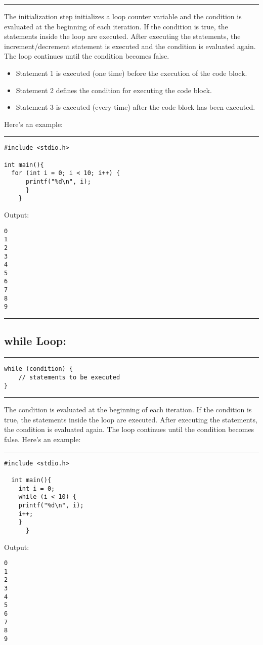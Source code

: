 \documentclass[a4paper]{article}
\begin{document}
\noindent\rule{\textwidth}{0.5pt}
The initialization step initializes a loop counter variable and the condition is
evaluated at the beginning of each iteration. If the condition is true, the
statements inside the loop are executed. After executing the statements, the
increment/decrement statement is executed and the condition is evaluated
again. The loop continues until the condition becomes false.

\begin{itemize}
\item Statement 1 is executed (one time) before the execution of the code block.
\item Statement 2 defines the condition for executing the code block.
\item Statement 3 is executed (every time) after the code block has been executed.
\end{itemize}

Here's an example:

\noindent\rule{\textwidth}{0.5pt}
\begin{verbatim}
#include <stdio.h>

int main(){
  for (int i = 0; i < 10; i++) {
      printf("%d\n", i);
      }
    }
\end{verbatim}
Output:
\begin{verbatim}
0
1
2
3
4
5
6
7
8
9
\end{verbatim}

\noindent\rule{\textwidth}{0.5pt}

\subsection{while Loop:}
\label{sec:orgeeb23ee}
\noindent\rule{\textwidth}{0.5pt}
\begin{verbatim}
while (condition) {
    // statements to be executed
}
\end{verbatim}

\noindent\rule{\textwidth}{0.5pt}
The condition is evaluated at the beginning of each iteration. If the condition
is true, the statements inside the loop are executed. After executing the
statements, the condition is evaluated again. The loop continues until the
condition becomes false.
Here's an example:

\noindent\rule{\textwidth}{0.5pt}
\begin{verbatim}
#include <stdio.h>

  int main(){
	int i = 0;
	while (i < 10) {
	printf("%d\n", i);
	i++;
    }
      }
\end{verbatim}
Output:
\begin{verbatim}
0
1
2
3
4
5
6
7
8
9
\end{verbatim}
\end{document}
